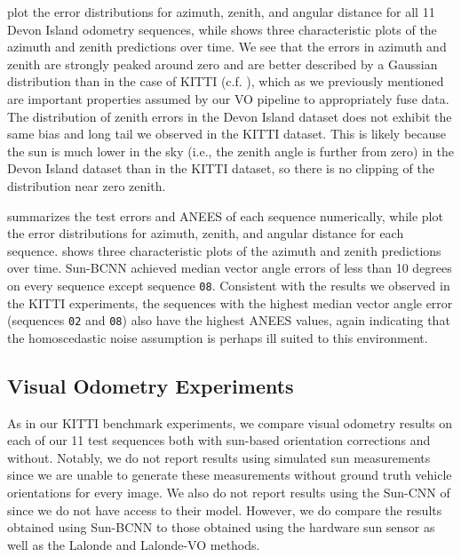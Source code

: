  plot the error distributions for azimuth, zenith, and angular distance for all 11 Devon Island odometry sequences, while  shows three characteristic plots of the azimuth and zenith predictions over time. 
We see that the errors in azimuth and zenith are strongly peaked around zero and are better described by a Gaussian distribution than in the case of KITTI (c.f. ), which as we previously mentioned are important properties assumed by our VO pipeline to appropriately fuse data.
The distribution of zenith errors in the Devon Island dataset does not exhibit the same bias and long tail we observed in the KITTI dataset. 
This is likely because the sun is much lower in the sky (i.e., the zenith angle is further from zero) in the Devon Island dataset than in the KITTI dataset, so there is no clipping of the distribution near zero zenith.

 summarizes the test errors and ANEES of each sequence numerically, while  plot the error distributions for azimuth, zenith, and angular distance for each sequence. 
 shows three characteristic plots of the azimuth and zenith predictions over time. 
Sun-BCNN achieved median vector angle errors of less than 10 degrees on every sequence except sequence \texttt{08}.
Consistent with the results we observed in the KITTI experiments, the sequences with the highest median vector angle error (sequences \texttt{02} and \texttt{08}) also have the highest ANEES values, again indicating that the homoscedastic noise assumption is perhaps ill suited to this environment.


\subsection{Visual Odometry Experiments}
As in our KITTI benchmark experiments, we compare visual odometry results on each of our 11 test sequences both with sun-based orientation corrections and without.
Notably, we do not report results using simulated sun measurements since we are unable to generate these measurements without ground truth vehicle orientations for every image.
We also do not report results using the Sun-CNN of \citet{Ma2016-at} since we do not have access to their model.
However, we do compare the results obtained using Sun-BCNN to those obtained using the hardware sun sensor as well as the Lalonde \citep{Lalonde2011-jw} and Lalonde-VO \citep{2017_Clement_Improving} methods.

